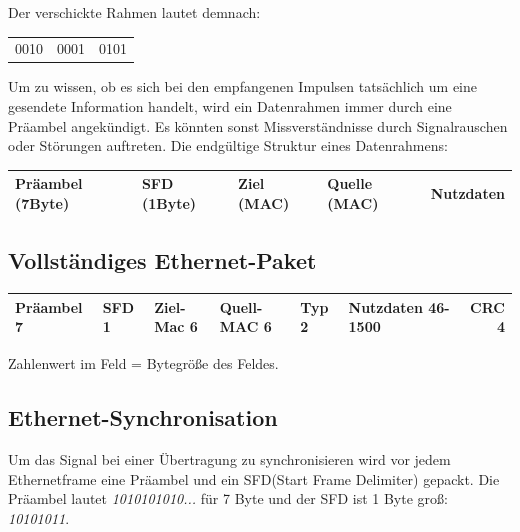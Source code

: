 \documentclass[12pt,a4paper]{article}
\begin{document}
			Der verschickte Rahmen lautet demnach:
			\begin{center}
				\begin{tabularx}{5cm}{XXX}
					0010&0001&0101\\
				\end{tabularx}
			\end{center}
			Um zu wissen, ob es sich bei den empfangenen Impulsen tatsächlich um eine gesendete Information handelt, wird ein Datenrahmen immer durch eine Präambel angekündigt. Es könnten sonst Missverständnisse durch Signalrauschen oder Störungen auftreten. Die endgültige Struktur eines Datenrahmens:
			\begin{center}
				\begin{tabularx}{17cm}{|l|l|X|X|X|}
					\hline
					Präambel (7Byte)&SFD (1Byte)&Ziel (MAC)&Quelle (MAC)&Nutzdaten\\
					\hline
				\end{tabularx}
			\end{center}
		   
		\subsection{Vollständiges Ethernet-Paket}
			\begin{center}
				\renewcommand{\arraystretch}{1.5}
				\begin{tabularx}{17cm}{|l|l|l|X|X|X|r|}
					\hline
					Präambel 7&SFD 1&Ziel-Mac 6&Quell-MAC 6&Typ 2&Nutzdaten 46-1500&CRC 4\\
					\hline
				\end{tabularx}
			\end{center}
			\begin{center}
				Zahlenwert im Feld = Bytegröße des Feldes.
			\end{center}

		\subsection{Ethernet-Synchronisation}
			Um das Signal bei einer Übertragung zu synchronisieren wird vor jedem Ethernetframe eine Präambel und ein SFD(Start Frame Delimiter) gepackt. Die Präambel lautet \textit{1010101010...} für 7 Byte und der SFD ist 1 Byte groß: \textit{10101011}.
\end{document}
